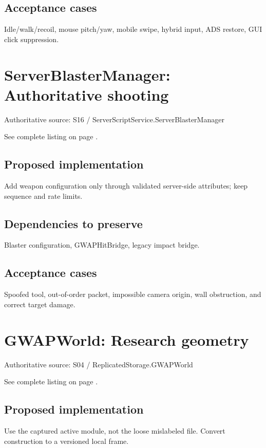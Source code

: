 \subsection{Acceptance cases}
Idle/\allowbreak{}walk/\allowbreak{}recoil, mouse pitch/\allowbreak{}yaw, mobile swipe, hybrid input, ADS restore, GUI click suppression.\allowbreak{}

\section{ServerBlasterManager: Authoritative shooting}
Authoritative source: S16 /\allowbreak{} ServerScriptService.\allowbreak{}ServerBlasterManager

See complete listing on page \pageref{src:S16}.

\subsection{Proposed implementation}
Add weapon configuration only through validated server-side attributes; keep sequence and rate limits.\allowbreak{}

\subsection{Dependencies to preserve}
Blaster configuration, GWAPHitBridge, legacy impact bridge.\allowbreak{}

\subsection{Acceptance cases}
Spoofed tool, out-of-order packet, impossible camera origin, wall obstruction, and correct target damage.\allowbreak{}

\section{GWAPWorld: Research geometry}
Authoritative source: S04 /\allowbreak{} ReplicatedStorage.\allowbreak{}GWAPWorld

See complete listing on page \pageref{src:S04}.

\subsection{Proposed implementation}
Use the captured active module, not the loose mislabeled file.\allowbreak{} Convert construction to a versioned local frame.\allowbreak{}

